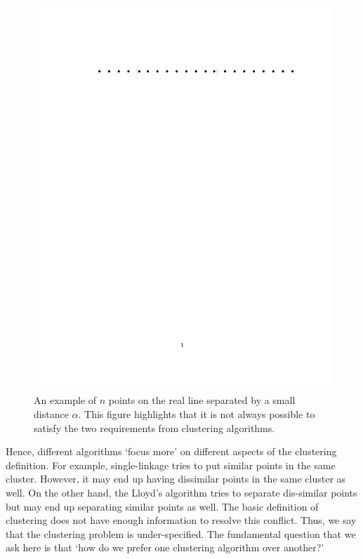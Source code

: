 \documentclass[12pt]{article}
\begin{document}
\begin{figure}
\includegraphics[trim={100 650 30 120},clip,width=\textwidth]{figures/conflictingReq.pdf}
\caption{An example of $n$ points on the real line separated by a small distance $\alpha$. This figure highlights that it is not always possible to satisfy the two requirements from clustering algorithms.}
\label{fig:conflictingReq}
\end{figure}

Hence, different algorithms `focus more' on different aspects of the clustering definition. For example, single-linkage tries to put similar points in the same cluster. However, it may end up having dissimilar points in the same cluster as well. On the other hand, the Lloyd's algorithm tries to separate dis-similar points but may end up separating similar points as well. The basic definition of clustering does not have enough information to resolve this conflict. Thus, we say that the clustering problem is under-specified. The fundamental question that we ask here is that `how do we prefer one clustering algorithm over another?'
\end{document}
